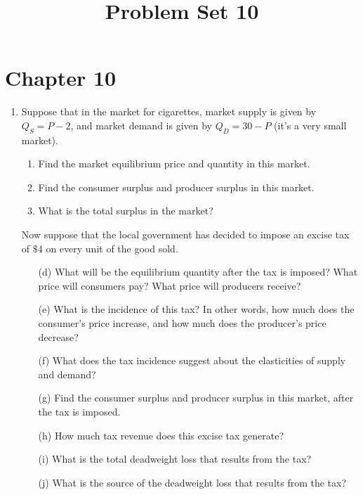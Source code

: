 \documentclass[11pt]{article}
\title{Problem Set 10}
\begin{document}
  
\section*{Chapter 10}

\begin{enumerate}
  \item Suppose that in the market for cigarettes, market supply is given by $Q_S = P - 2$, and market demand is given by $Q_D = 30 - P$ (it's a very small market).

  \begin{enumerate}
    \item Find the market equilibrium price and quantity in this market.

    \item Find the consumer surplus and producer surplus in this market.

    \item What is the total surplus in the market?
  \end{enumerate}

  Now suppose that the local government has decided to impose an excise tax of $\$4$ on every unit of the good sold.

  \begin{enumerate}
    \item[(d)] What will be the equilibrium quantity after the tax is imposed? What price will consumers pay? What price will producers receive?

    \item[(e)] What is the incidence of this tax? In other words, how much does the consumer's price increase, and how much does the producer's price decrease?

    \item[(f)] What does the tax incidence suggest about the elasticities of supply and demand?

    \item[(g)] Find the consumer surplus and producer surplus in this market, after the tax is imposed.

    \item[(h)] How much tax revenue does this excise tax generate?

    \item[(i)] What is the total deadweight loss that results from the tax?

    \item[(j)] What is the source of the deadweight loss that results from the tax?
  \end{enumerate}



\end{enumerate}
\end{document}
